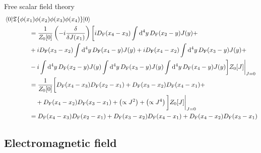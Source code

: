 \begin{example}{Free scalar field theory}{}
  \begin{equation*}
    \begin{split}
      & \braket{0 | \mathfrak{T}\{\phi(x_1) \phi(x_2) \phi(x_3) \phi(x_4)\} | 0} \\
      & \qquad \qquad = \frac{1}{Z_0[0]} \left( -i \frac{\delta}{\delta J(x_1)} \right) \bigg[ i D_\text{F}(x_4 - x_3) \int \mathrm{d}^4y\, D_\text{F}(x_2 - y) J(y) + \\
      & \qquad \qquad + i D_\text{F}(x_3 - x_2) \int \mathrm{d}^4y\, D_\text{F}(x_4 - y) J(y) + i D_\text{F}(x_4 - x_2) \int \mathrm{d}^4y\, D_\text{F}(x_3 - y) J(y) + \\
      & \qquad \qquad - i \int \mathrm{d}^4y\, D_\text{F}(x_2 - y) J(y) \int \mathrm{d}^4y\, D_\text{F}(x_3 - y) J(y) \int \mathrm{d}^4y\, D_\text{F}(x_4 - y) J(y) \bigg] Z_0[J] \bigg\vert_{J = 0} \\
      & \qquad \qquad = \frac{1}{Z_0[0]} \bigg[ D_\text{F}(x_4 - x_3) D_\text{F}(x_2 - x_1) + D_\text{F}(x_3 - x_2) D_\text{F}(x_4 - x_1) + \\
      & \qquad \qquad \quad + D_\text{F}(x_4 - x_2) D_\text{F}(x_3 - x_1) + \left( \propto J^2 \right) + \left( \propto J^4 \right) \bigg] Z_0[J] \bigg\vert_{J = 0} \\
      & \qquad \qquad = D_\text{F}(x_4 - x_3) D_\text{F}(x_2 - x_1) + D_\text{F}(x_3 - x_2) D_\text{F}(x_4 - x_1) + D_\text{F}(x_4 - x_2) D_\text{F}(x_3 - x_1)
    \end{split}
  \end{equation*}
\end{example}

\subsection{Electromagnetic field}

